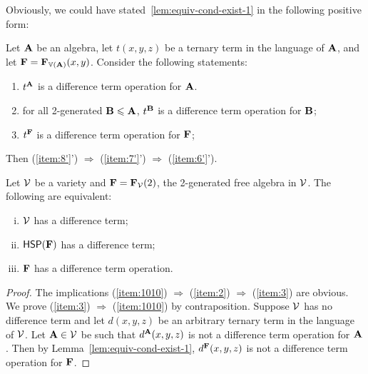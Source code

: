 Obviously, we could have stated~\ref{lem:equiv-cond-exist-1} in the following positive form:
\begin{cor}
  Let $\mathbf{A}$ be an algebra, let $t(x,y,z)$ be a ternary term in the language
  of $\mathbf{A}$, and let $\mathbf{F} = \mathbf{F}_{\operatorname{\mathbb{V}}(\mathbf{A})}(x,y)$. Consider the following statements:
  \begin{enumerate}[(A')]
  \item \label{item:6'} $t^{\mathbf{A}}$ is a difference term operation for $\mathbf{A}$.
  \item \label{item:7'} for all 2-generated $\mathbf{B} \leqslant \mathbf{A}$,
    $t^{\mathbf{B}}$ is a difference term operation for $\mathbf{B}$;
  \item \label{item:8'} $t^{\mathbf{F}}$ is a difference term operation for $\mathbf{F}$;
  \end{enumerate}
  Then (\ref{item:8'}') $\Rightarrow$ (\ref{item:7'}') $\Rightarrow$ (\ref{item:6'}').
\end{cor}


\begin{thm}
  \label{thm:F}
Let $\mathcal{V}$ be a variety and $\mathbf{F} = \mathbf{F}_{\mathcal{V}}(2)$, the 2-generated
free algebra in $\mathcal{V}$. The following are equivalent:
\begin{enumerate}[(i)]
\item \label{item:1010}
  $\mathcal{V}$ has a difference term;
\item \label{item:2}
  $\mathsf{H} \mathsf{S} \mathsf{P} (\mathbf{F})$ has a difference term;
\item \label{item:3}
  $\mathbf{F}$ has a difference term operation.
\end{enumerate}
\end{thm}
\begin{proof}
  The implications
  (\ref{item:1010}) $\Rightarrow$  (\ref{item:2}) $\Rightarrow$  (\ref{item:3}) are
  obvious. We prove
  (\ref{item:3}) $\Rightarrow$  (\ref{item:1010}) by contraposition.
  Suppose $\mathcal{V}$ has no difference term and let
  $d(x,y,z)$ be an arbitrary ternary term in the language of $\mathcal{V}$.
  Let $\mathbf{A}\in \mathcal{V}$ be such that $d^{\mathbf{A}}(x,y,z)$ is not a difference term
  operation for $\mathbf{A}$. Then by Lemma~\ref{lem:equiv-cond-exist-1}, $d^{\mathbf{F}}(x,y,z)$
  is not a difference term operation for $\mathbf{F}$.
\end{proof}

